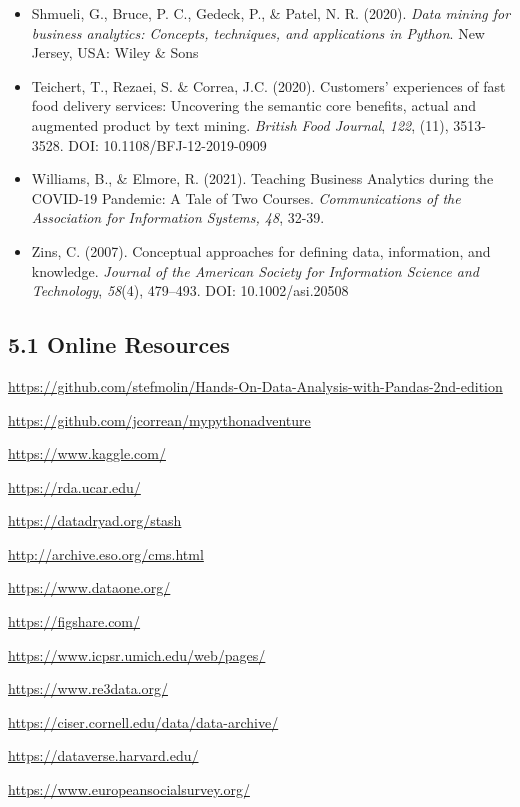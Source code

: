 \documentclass[letterpaper,11pt]{article}
\begin{document}
\begin{itemize}
\item Shmueli, G., Bruce, P. C., Gedeck, P., \& Patel, N. R. (2020). \textit{Data mining for business analytics: Concepts, techniques, and applications in Python}. New Jersey, USA: Wiley & Sons 
\item Teichert, T., Rezaei, S. \& Correa, J.C. (2020). Customers’ experiences of fast food delivery services: Uncovering the semantic core benefits, actual and augmented product by text mining. \textit{British Food Journal}, \textit{122}, (11), 3513-3528. DOI: 10.1108/BFJ-12-2019-0909
\item Williams, B., \& Elmore, R. (2021). Teaching Business Analytics during the COVID-19 Pandemic: A Tale of Two Courses. \textit{Communications of the Association for Information Systems, 48}, 32-39. 
\item Zins, C. (2007). Conceptual approaches for defining data, information, and knowledge. \textit{Journal of the American Society for Information Science and Technology}, \textit{58}(4), 479–493. DOI: 10.1002/asi.20508
\end{itemize}




\subsection{5.1 Online Resources}
\textcolor{blue}{\url{https://github.com/stefmolin/Hands-On-Data-Analysis-with-Pandas-2nd-edition}}

\textcolor{blue}{\url{https://github.com/jcorrean/mypythonadventure}}

\textcolor{blue}{\url{https://www.kaggle.com/}}

\textcolor{blue}{\url{https://rda.ucar.edu/}}

\textcolor{blue}{\url{https://datadryad.org/stash}}

\textcolor{blue}{\url{http://archive.eso.org/cms.html}}

\textcolor{blue}{\url{https://www.dataone.org/}}

\textcolor{blue}{\url{https://figshare.com/}}

\textcolor{blue}{\url{https://www.icpsr.umich.edu/web/pages/}}

\textcolor{blue}{\url{https://www.re3data.org/}}

\textcolor{blue}{\url{https://ciser.cornell.edu/data/data-archive/}}

\textcolor{blue}{\url{https://dataverse.harvard.edu/}}

\textcolor{blue}{\url{https://www.europeansocialsurvey.org/}}

% 
% 
\end{document}
